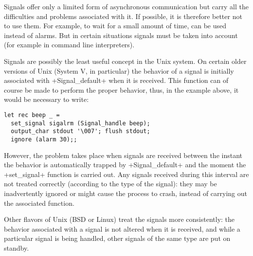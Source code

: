Signals offer only a limited form of asynchronous communication but
carry all the difficulties and problems associated with it. If possible,
it is therefore better not to use them. For example, to wait for a small
amount of time,  can be used instead of alarms. But
in certain situations signals must be taken into account (for example in
command line interpreters).

Signals are possibly the least useful concept in the Unix system.  On
certain older versions of Unix (System V, in particular) the behavior
of a signal is initially associated with
\ml+Signal_default+ when it is received.  This function can of course
be made to perform the proper behavior, thus, in the 
example above, it would be necessary to write:

\begin{lstlisting}
let rec beep _ =
  set_signal sigalrm (Signal_handle beep);
  output_char stdout '\007'; flush stdout;
  ignore (alarm 30);;
\end{lstlisting}

However, the problem takes place when signals are received between the
instant the behavior is automatically trapped by \ml+Signal_default+
and the moment the \ml+set_signal+ function is carried out.  
Any signals received during this interval are not treated correctly 
(according to the type of the signal): they may be inadvertently 
ignored or might cause the process to crash, instead of carrying 
out the associated function.

Other flavors of Unix (BSD or Linux) treat the 
signals more consistently: the behavior associated with a 
signal is not altered when it is received, and while a particular 
signal is being handled, other signals of the same type are put on standby.

